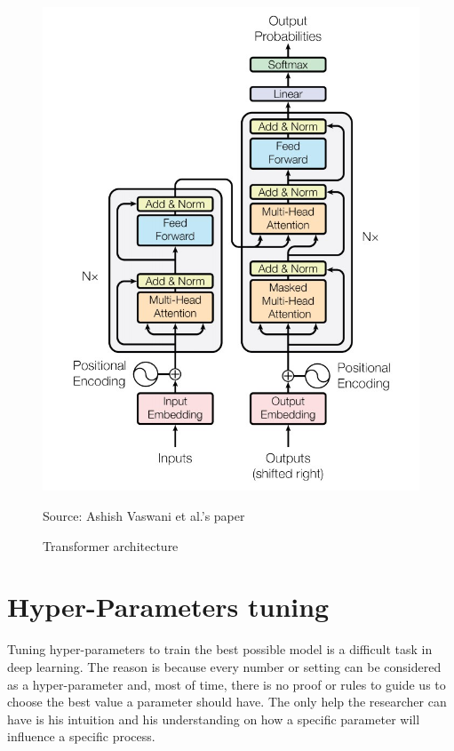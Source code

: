 \documentclass[12pt]{report}
\begin{document}
\begin{figure}[htbp]
    \centering
    \includegraphics[width=\textwidth]{images/related_works/transformer/transformer_architecture.jpg}
    \caption{Transformer architecture}
    Source: Ashish Vaswani et al.'s paper \cite{vaswani_attention_2017-1}
    \label{fig:arch:transformer}
\end{figure}

\section{Hyper-Parameters tuning}
\label{appendix:hp-tuning}

Tuning hyper-parameters to train the best possible model is a difficult task in deep learning.
The reason is because every number or setting can be considered as a hyper-parameter and, most of time, there is no proof or rules to guide us to choose the best value a parameter should have.
The only help the researcher can have is his intuition and his understanding on how a specific parameter will influence a specific process.
\end{document}
